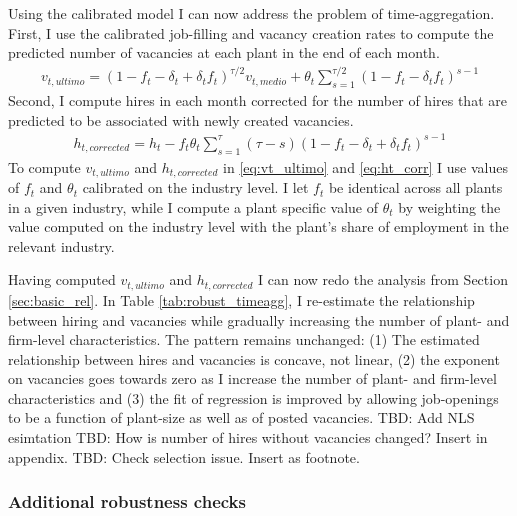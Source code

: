 Using the calibrated model I can now address the problem of time-aggregation. First, I use the calibrated job-filling  and vacancy creation rates to compute the predicted number of vacancies at each plant in the end of each month. 
\begin{align}
v_{t,ultimo}=\left( 1-f_t-\delta_t+\delta_t f_t \right)^{\tau/2} v_{t,medio} + \theta_t \sum_{s=1}^{\tau/2} \left( 1-f_t-\delta_t f_t \right)^{s-1} \label{eq:vt_ultimo}
\end{align}
Second, I compute hires in each month corrected for the number of hires that are predicted to be associated with newly created vacancies. 
\begin{align}
h_{t,corrected}=h_t-f_t \theta_t \sum_{s=1}^{\tau} \left( \tau- s\right) \left( 1-f_t-\delta_t+\delta_t f_t \right)^{s-1} \label{eq:ht_corr}
\end{align}
To compute $v_{t,ultimo}$ and $h_{t,corrected}$ in \eqref{eq:vt_ultimo} and \eqref{eq:ht_corr} I use values of $f_t$ and $\theta_t$ calibrated on the industry level. I let $f_t$ be identical across all plants in a given industry, while I compute a plant specific value of $\theta_t$ by weighting the value computed on the industry level with the plant's share of employment in the relevant industry. 

Having computed $v_{t,ultimo}$ and $h_{t,corrected}$ I can now redo the analysis from Section \ref{sec:basic_rel}. In Table \ref{tab:robust_timeagg}, I re-estimate the relationship between hiring and vacancies while gradually increasing the number of plant- and firm-level characteristics. The pattern remains unchanged: (1) The estimated relationship between hires and vacancies is concave, not linear, (2) the exponent on vacancies goes towards zero as I increase the number of plant- and firm-level characteristics and (3) the fit of regression is improved by allowing job-openings to be a function of plant-size as well as of posted vacancies. 
TBD: Add NLS esimtation
TBD: How is number of hires without vacancies changed? Insert in appendix.
TBD: Check selection issue. Insert as footnote.

\FloatBarrier




\subsubsection{Additional robustness checks}

